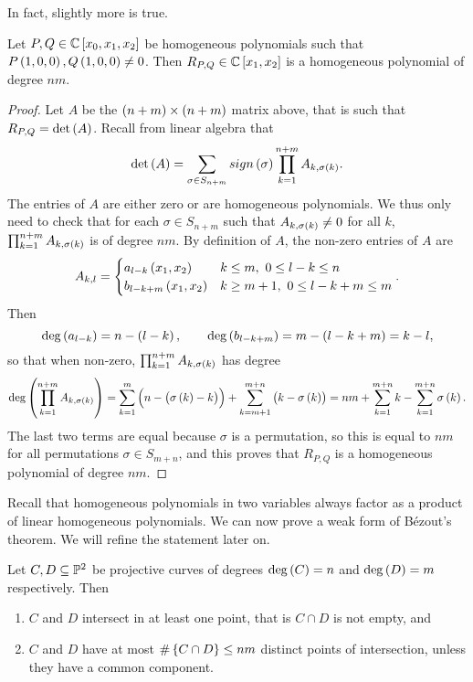 \pagebreak

In fact, slightly more is true.

\begin{theorem}
\label{thm:9.7}
Let $ P, Q \in \C\sbr{x_0, x_1, x_2} $ be homogeneous polynomials such that $ P\br{1, 0, 0}, Q\br{1, 0, 0} \ne 0 $. Then $ R_{P, Q} \in \C\sbr{x_1, x_2} $ is a homogeneous polynomial of degree $ nm $.
\end{theorem}

\begin{proof}
Let $ A $ be the $ \br{n + m} \times \br{n + m} $ matrix above, that is such that $ R_{P, Q} = \det\br{A} $. Recall from linear algebra that
$$ \det\br{A} = \sum_{\sigma \in S_{n + m}} sign\br{\sigma}\prod_{k = 1}^{n + m}A_{k, \sigma\br{k}}. $$
The entries of $ A $ are either zero or are homogeneous polynomials. We thus only need to check that for each $ \sigma \in S_{n + m} $ such that $ A_{k, \sigma\br{k}} \ne 0 $ for all $ k $, $ \prod_{k = 1}^{n + m} A_{k, \sigma\br{k}} $ is of degree $ nm $. By definition of $ A $, the non-zero entries of $ A $ are
$$ A_{k, l} =
\begin{cases}
a_{l - k}\br{x_1, x_2} & k \le m, \ 0 \le l - k \le n \\
b_{l - k + m}\br{x_1, x_2} & k \ge m + 1, \ 0 \le l - k + m \le m
\end{cases}.
$$
Then
$$ \deg\br{a_{l - k}} = n - \br{l - k}, \qquad \deg\br{b_{l - k + m}} = m - \br{l - k + m} = k - l, $$
so that when non-zero, $ \prod_{k = 1}^{n + m} A_{k, \sigma\br{k}} $ has degree
$$ \deg\br{\prod_{k = 1}^{n + m} A_{k, \sigma\br{k}}} = \sum_{k = 1}^m \br{n - \br{\sigma\br{k} - k}} + \sum_{k = m + 1}^{m + n} \br{k - \sigma\br{k}} = nm + \sum_{k = 1}^{m + n} k - \sum_{k = 1}^{m + n} \sigma\br{k}. $$
The last two terms are equal because $ \sigma $ is a permutation, so this is equal to $ nm $ for all permutations $ \sigma \in S_{m + n} $, and this proves that $ R_{P, Q} $ is a homogeneous polynomial of degree $ nm $.
\end{proof}

Recall that homogeneous polynomials in two variables always factor as a product of linear homogeneous polynomials. We can now prove a weak form of B\'ezout's theorem. We will refine the statement later on.

\begin{theorem}
\label{thm:9.8}
Let $ C, D \subseteq \P^2 $ be projective curves of degrees $ \deg\br{C} = n $ and $ \deg\br{D} = m $ respectively. Then
\begin{enumerate}
\item $ C $ and $ D $ intersect in at least one point, that is $ C \cap D $ is not empty, and
\item $ C $ and $ D $ have at most $ \#\cbr{C \cap D} \le nm $ distinct points of intersection, unless they have a common component.
\end{enumerate}
\end{theorem}

